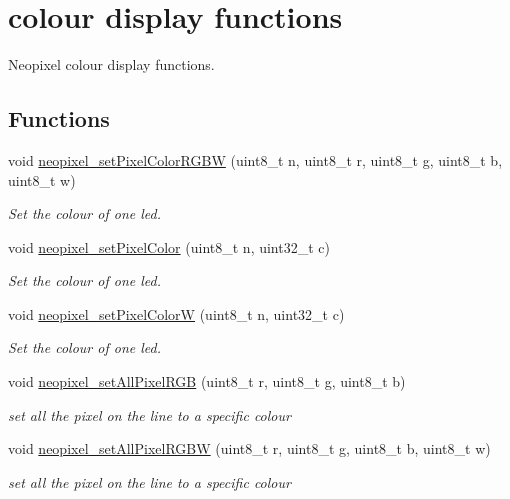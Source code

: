 \hypertarget{group___display}{}\section{colour display functions}
\label{group___display}


Neopixel colour display functions.  


\subsection*{Functions}
\begin{DoxyCompactItemize}
\item 
void \hyperlink{group___display_ga8eb6ad73b1bd1df8bddc2615035a3371}{neopixel\+\_\+set\+Pixel\+Color\+R\+G\+BW} (uint8\+\_\+t n, uint8\+\_\+t r, uint8\+\_\+t g, uint8\+\_\+t b, uint8\+\_\+t w)
\begin{DoxyCompactList}\small\item\em Set the colour of one led. \end{DoxyCompactList}\item 
void \hyperlink{group___display_ga71a91c14cda530d83c6bbb241fc9bf96}{neopixel\+\_\+set\+Pixel\+Color} (uint8\+\_\+t n, uint32\+\_\+t c)
\begin{DoxyCompactList}\small\item\em Set the colour of one led. \end{DoxyCompactList}\item 
void \hyperlink{group___display_gaff8fc0f23014295654811a1ec909f204}{neopixel\+\_\+set\+Pixel\+ColorW} (uint8\+\_\+t n, uint32\+\_\+t c)
\begin{DoxyCompactList}\small\item\em Set the colour of one led. \end{DoxyCompactList}\item 
void \hyperlink{group___display_ga7a6c2dc149e86a788aede1d6aa5262d7}{neopixel\+\_\+set\+All\+Pixel\+R\+GB} (uint8\+\_\+t r, uint8\+\_\+t g, uint8\+\_\+t b)
\begin{DoxyCompactList}\small\item\em set all the pixel on the line to a specific colour \end{DoxyCompactList}\item 
void \hyperlink{group___display_ga1ba017c1f338ef2c8e4a48acae35d87e}{neopixel\+\_\+set\+All\+Pixel\+R\+G\+BW} (uint8\+\_\+t r, uint8\+\_\+t g, uint8\+\_\+t b, uint8\+\_\+t w)
\begin{DoxyCompactList}\small\item\em set all the pixel on the line to a specific colour \end{DoxyCompactList}\end{DoxyCompactItemize}


